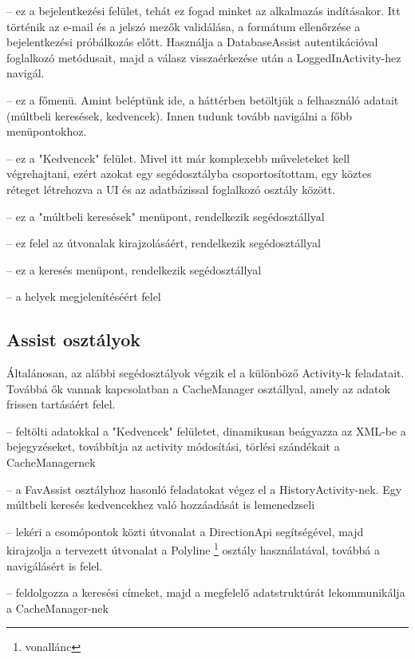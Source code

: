 \begin{description}
	\setlength{\itemsep}{0.04mm}
	\item[LoginTabActivity] -- ez a bejelentkezési felület, tehát ez fogad minket az alkalmazás indításakor. Itt történik az e-mail és a jelszó mezők validálása, a formátum ellenőrzése a bejelentkezési próbálkozás előtt. Használja a DatabaseAssist autentikációval foglalkozó metódusait, majd a válasz visszaérkezése után a LoggedInActivity-hez navigál.
	\item[LoggedInActivity] -- ez a főmenü. Amint beléptünk ide, a háttérben betöltjük a felhasználó adatait (múltbeli keresések, kedvencek). Innen tudunk tovább navigálni a főbb menüpontokhoz.
	\item[FavActivity] --  ez a "Kedvencek" felület. Mivel itt már komplexebb műveleteket kell végrehajtani, ezért azokat egy segédosztályba csoportosítottam, egy köztes réteget létrehozva a UI és az adatbázissal foglalkozó osztály között.
	\item[HistoryActivity] -- ez a "múltbeli keresések" menüpont, rendelkezik segédosztállyal 
	\item[MultiRouteActivity] -- ez felel az útvonalak kirajzolásáért, rendelkezik segédosztállyal 
	\item[SearchActivity] -- ez a keresés menüpont, rendelkezik segédosztállyal 
	\item[ShowMapActivity] -- a helyek megjelenítéséért felel
\end{description}

\subsection{Assist osztályok}\label{sec:ALAP:adatelem}

Általánosan, az alábbi segédosztályok végzik el a különböző Activity-k feladatait. Továbbá ők vannak kapcsolatban a CacheManager osztállyal, amely az adatok frissen tartásáért felel.

\begin{description}
	\setlength{\itemsep}{0.04mm}
	\item[FavAssist] -- feltölti adatokkal a "Kedvencek" felületet, dinamikusan beágyazza az XML-be a bejegyzéseket, továbbítja az activity módosítási, törlési szándékait a CacheManagernek
	\item[HistoryAssist] -- a FavAssist osztályhoz hasonló feladatokat végez el a HistoryActivity-nek. Egy múltbeli keresés kedvencekhez való hozzáadását is lemenedzseli
	\item[MultiRoutAssist] -- lekéri a csomópontok közti útvonalat a DirectionApi segítségével, majd kirajzolja a tervezett útvonalat a Polyline%
	\footnote{ %
		vonallánc
	}  %
 osztály használatával, továbbá a navigálásért is felel.
	\item[SearchAssist] -- feldolgozza a keresési címeket, majd a megfelelő adatstruktúrát lekommunikálja a CacheManager-nek
\end{description}


